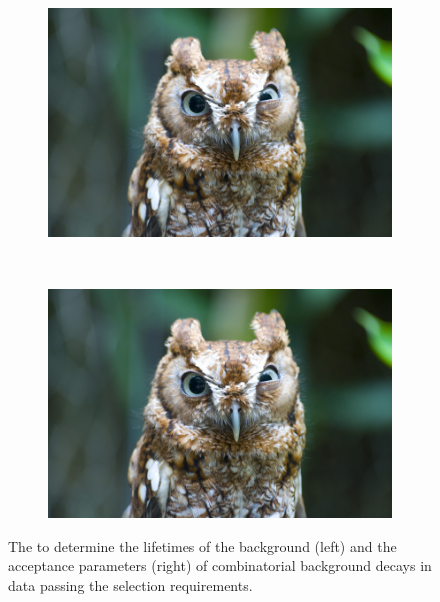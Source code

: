 {\begin{figure}[htbp]
    \centering
   \begin{subfigure}[b]{0.48\textwidth}
        \includegraphics[width= \textwidth]{./Figs/placeholder.jpeg}
    \end{subfigure}
   ~ %
    \begin{subfigure}[b]{0.48\textwidth}
       \includegraphics[width=\textwidth]{./Figs/placeholder.jpeg}
   \end{subfigure}
    \caption{The \ml to determine the lifetimes of the background (left) and the acceptance parameters (right) of combinatorial background decays in data passing the \bhh selection requirements.}
    \label{fig:CBGaccpt}
\end{figure}


}
